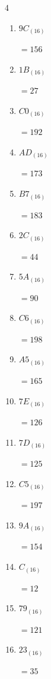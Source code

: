 \begin{multicols}{4}
\begin{enumerate}
        $=62$

  \item $9C_{(16)}$

        $=156$

  \item $1B_{(16)}$

        $=27$

  \item $C0_{(16)}$

        $=192$

  \item $AD_{(16)}$

        $=173$

  \item $B7_{(16)}$

        $=183$

  \item $2C_{(16)}$

        $=44$

  \item $5A_{(16)}$

        $=90$

  \item $C6_{(16)}$

        $=198$

  \item $A5_{(16)}$

        $=165$

  \item $7E_{(16)}$

        $=126$

  \item $7D_{(16)}$

        $=125$

  \item $C5_{(16)}$

        $=197$

  \item $9A_{(16)}$

        $=154$

  \item $C_{(16)}$

        $=12$

\columnbreak %

  \item $79_{(16)}$

        $=121$

  \item $23_{(16)}$

        $=35$


\end{enumerate}
\end{multicols}
